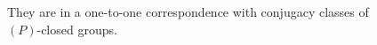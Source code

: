 \documentclass[preview]{standalone}
\begin{document}
\begin{center}
They are in a one-to-one correspondence with conjugacy classes of \\ $(P)$-closed groups.
\end{center}
\end{document}
